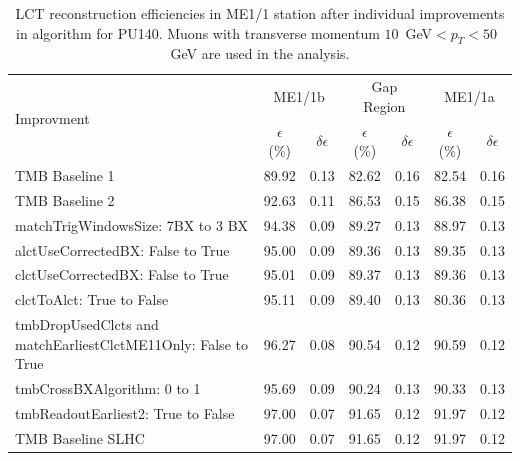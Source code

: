 \begin{table}[h]
\begin{tabular}{| p{7.4 cm}| c | c | c | c | c | c | }
\hline
\multirow{2}{*}{Improvment} & \multicolumn {2}{|c|}{ME1/1b} & \multicolumn{2}{|c|}{Gap Region} & \multicolumn{2}{|c|}{ME1/1a} \\ \cline{2-7}
                            & $\epsilon$ (\%)  & $\delta \epsilon$ & $\epsilon$ (\%) & $\delta \epsilon$ & $\epsilon$ (\%) & $\delta \epsilon$ \\  \hline
TMB Baseline 1 & 89.92 & 0.13 & 82.62 & 0.16 & 82.54 & 0.16 \\ \hline
TMB Baseline 2 & 92.63 & 0.11 & 86.53 & 0.15 & 86.38 & 0.15 \\ \hline
matchTrigWindowsSize: 7BX to 3 BX & 94.38 & 0.09 & 89.27 & 0.13 & 88.97 & 0.13 \\ \hline
alctUseCorrectedBX: False to True & 95.00 & 0.09 & 89.36 & 0.13 & 89.35 &  0.13  \\ \hline 
clctUseCorrectedBX: False to True & 95.01 & 0.09 & 89.37 & 0.13 & 89.36 & 0.13 \\ \hline
clctToAlct: True to False & 95.11 & 0.09 & 89.40 & 0.13 & 80.36 & 0.13 \\ \hline
tmbDropUsedClcts and matchEarliestClctME11Only: False to True & 96.27 & 0.08 & 90.54 & 0.12 & 90.59 & 0.12 \\ \hline
tmbCrossBXAlgorithm: 0 to 1 & 95.69 & 0.09 & 90.24 & 0.13 & 90.33 & 0.13 \\ \hline
tmbReadoutEarliest2: True to False & 97.00 & 0.07 & 91.65 & 0.12 & 91.97 & 0.12 \\ \hline
TMB Baseline SLHC & 97.00 & 0.07 & 91.65 & 0.12 & 91.97 & 0.12 \\ \hline
\end{tabular}
\caption{LCT reconstruction efficiencies in ME1/1 station after individual improvements in algorithm for PU140. Muons with transverse momentum $10$~GeV$<p_T<50$~ GeV are used in the analysis.}
\label{eff_pu140}
\end{table}

